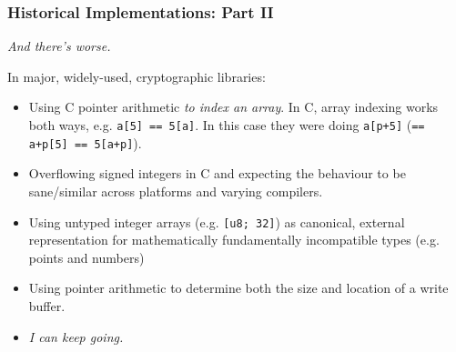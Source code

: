 \documentclass[xetex,aspectratio=169]{beamer}
\begin{document}
%
%
%
%
%
%
%
%
%
%
%

  \begin{frame}
    \frametitle{Historical Implementations: Part II}

    \emph{And there's worse.}

    \pause In major, widely-used, cryptographic libraries:

    \begin{itemize}
      \item<2-> Using C pointer arithmetic \emph{to index an array}.  In C,
        array indexing works both ways, e.g. \texttt{a[5] == 5[a]}. In this case
        they were doing \texttt{a[p+5]} (\texttt{== a+p[5] == 5[a+p]}).
      \item<3-> Overflowing signed integers in C and expecting the behaviour to
        be sane/similar across platforms and varying compilers.
      \item<4-> Using untyped integer arrays (e.g. \texttt{[u8; 32]}) as
        canonical, external representation for mathematically fundamentally
        incompatible types (e.g. points and numbers)
      \item<5-> Using pointer arithmetic to determine both the size and location
        of a write buffer.
      \item<6-> \emph{I can keep going.}
    \end{itemize}
  \end{frame}
\end{document}

